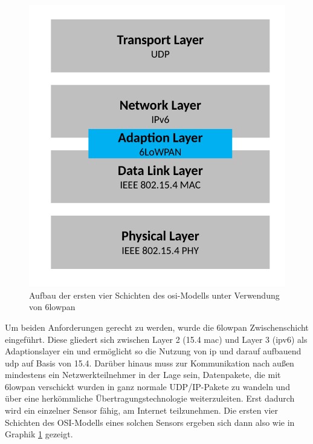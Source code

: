 \begin{figure}
	\centering
	\includegraphics[width=\textwidth/2]{Grafiken-Alex/6lowpan-osi.pdf}
	\caption{Aufbau der ersten vier Schichten des \ac{osi}-Modells unter Verwendung von \ac{6lowpan}}
	\label{6lowpan-osi}
\end{figure}
Um beiden Anforderungen gerecht zu werden, wurde die \ac{6lowpan} Zwischenschicht eingeführt. Diese gliedert sich zwischen Layer 2 (\ac{15.4} \ac{mac}) und Layer 3 (\ac{ipv6}) als Adaptionslayer ein und ermöglicht so die Nutzung von \ac{ip} und darauf aufbauend \ac{udp} auf Basis von \ac{15.4}. Darüber hinaus muss zur Kommunikation nach außen mindestens ein Netzwerkteilnehmer in der Lage sein, Datenpakete, die mit \ac{6lowpan} verschickt wurden in ganz normale UDP/IP-Pakete zu wandeln und über eine herkömmliche Übertragungstechnologie weiterzuleiten. Erst dadurch wird ein einzelner Sensor fähig, am Internet teilzunehmen. Die ersten vier Schichten des OSI-Modells eines solchen Sensors ergeben sich dann also wie in Graphik \ref{6lowpan-osi} gezeigt.